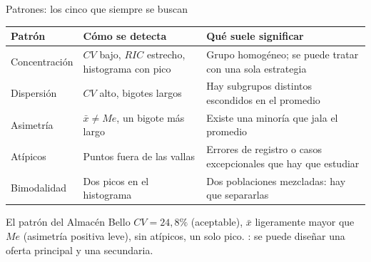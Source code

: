 \documentclass[aspectratio=169,10pt]{beamer}
\begin{document}
\begin{frame}{Patrones: los cinco que siempre se buscan}
  \scriptsize
  \begin{center}
  \begin{tabular}{@{}p{2.5cm}p{4.4cm}p{5.0cm}@{}}
    \toprule
    \textbf{Patrón} & \textbf{Cómo se detecta} & \textbf{Qué suele significar} \\
    \midrule
    Concentración & $CV$ bajo, $RIC$ estrecho, histograma con pico &
      Grupo homogéneo; se puede tratar con una sola estrategia \\
    \addlinespace
    Dispersión & $CV$ alto, bigotes largos &
      Hay subgrupos distintos escondidos en el promedio \\
    \addlinespace
    Asimetría & $\bar{x} \ne Me$, un bigote más largo &
      Existe una minoría que jala el promedio \\
    \addlinespace
    Atípicos & Puntos fuera de las vallas &
      Errores de registro o casos excepcionales que hay que estudiar \\
    \addlinespace
    Bimodalidad & Dos picos en el histograma &
      Dos poblaciones mezcladas: hay que separarlas \\
    \bottomrule
  \end{tabular}
  \end{center}

  \vspace{0.05cm}
  \begin{alertblock}{El patrón del Almacén Bello}
    \tiny
    $CV = 24{,}8\%$ (aceptable), $\bar{x}$ ligeramente mayor que $Me$
    (asimetría positiva leve), sin atípicos, un solo pico.
    : se puede diseñar una oferta principal y una secundaria.
  \end{alertblock}
\end{frame}
\end{document}
